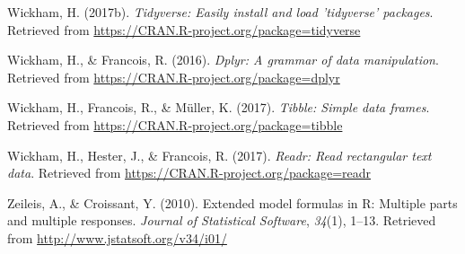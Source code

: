 \documentclass[english,man]{apa6}
\theoremstyle{definition}
\theoremstyle{definition}
\theoremstyle{remark}
\begin{document}
\hypertarget{ref-R-tidyverse}{}
Wickham, H. (2017b). \emph{Tidyverse: Easily install and load
'tidyverse' packages}. Retrieved from
\url{https://CRAN.R-project.org/package=tidyverse}

\hypertarget{ref-R-dplyr}{}
Wickham, H., \& Francois, R. (2016). \emph{Dplyr: A grammar of data
manipulation}. Retrieved from
\url{https://CRAN.R-project.org/package=dplyr}

\hypertarget{ref-R-tibble}{}
Wickham, H., Francois, R., \& Müller, K. (2017). \emph{Tibble: Simple
data frames}. Retrieved from
\url{https://CRAN.R-project.org/package=tibble}

\hypertarget{ref-R-readr}{}
Wickham, H., Hester, J., \& Francois, R. (2017). \emph{Readr: Read
rectangular text data}. Retrieved from
\url{https://CRAN.R-project.org/package=readr}

\hypertarget{ref-R-Formula}{}
Zeileis, A., \& Croissant, Y. (2010). Extended model formulas in R:
Multiple parts and multiple responses. \emph{Journal of Statistical
Software}, \emph{34}(1), 1--13. Retrieved from
\url{http://www.jstatsoft.org/v34/i01/}
\end{document}
